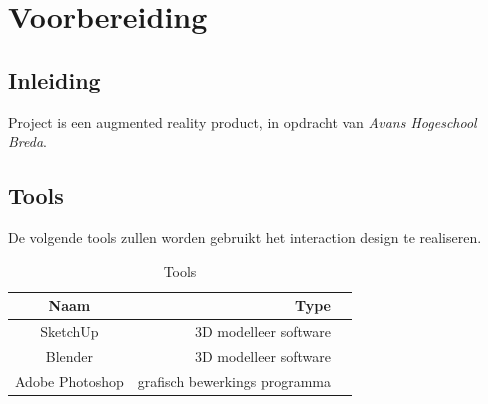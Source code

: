\chapter{Voorbereiding} \label{cha:voorbereiding}

\section{Inleiding} \label{sec:inleiding}
Project \projectname is een augmented reality product, in opdracht van \textit{Avans Hogeschool Breda}.

\section{Tools} \label{sec:tools}
De volgende tools zullen worden gebruikt het interaction design te realiseren.

\begin{table}[h]
  \centering
  \caption{Tools}
  \label{tb:table}
  \begin{tabular}{crl}
    \toprule
    Naam     & Type\\
    \midrule
    SketchUp     & 3D modelleer software\\
    Blender  & 3D modelleer software\\
    Adobe Photoshop & grafisch bewerkings programma\\    
    \bottomrule
  \end{tabular}
\end{table}

\newpage
